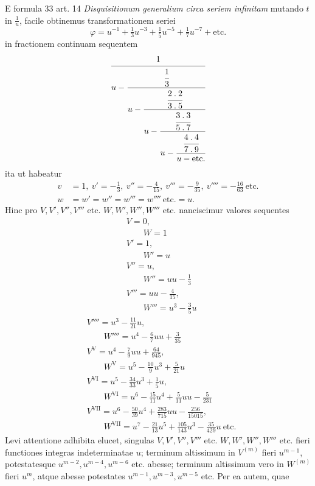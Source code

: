 E formula 33 art. 14 \textit{Disquisitionum generalium circa seriem infinitam} mutando $t$ in $\frac1u$, facile obtinemus transformationem seriei
\[
\varphi=u^{-1}+\tfrac13u^{-3}+\tfrac15u^{-5}+\tfrac17u^{-7}+\text{etc.}
\]
in fractionem continuam sequentem
\[
\cfrac{1}{u-\cfrac{\cfrac13}{u-\cfrac{\cfrac{2\mathbin{.}2}{3\mathbin{.}5}}{u-\cfrac{\cfrac{3\mathbin{.}3}{5\mathbin{.}7}}{u-\cfrac{\cfrac{4\mathbin{.}4}{7\mathbin{.}9}}{u-\text{etc.}}}}}}
\]
ita ut habeatur
\[
\begin{aligned}
v&=1,\ v'=-\tfrac13,\ v''=-\tfrac4{15},\ v'''=-\tfrac9{35},\ v''''=-\tfrac{16}{63}\ \text{etc.}\\
w&=w'=w''=w'''=w''''\ \text{etc.}=u.
\end{aligned}
\]
Hinc pro $V,V',V'',V'''$ etc. $W,W',W'',W'''$ etc. nanciscimur valores sequentes
\[
\begin{aligned}&V=0,\\[5pt]&\qquad W=1\\[5pt]&V'=1,\\[5pt]&\qquad W'=u\\[5pt]&V''=u,\\[5pt]&\qquad W''=uu-\tfrac13\\[5pt]&V'''=uu-\tfrac4{15},\\[5pt]&\qquad W'''=u^3-\tfrac35u\end{aligned}\]
\[\begin{aligned}&V''''=u^3-\tfrac{11}{21}u,\\[5pt]&\qquad W''''=u^4-\tfrac67uu+\tfrac3{35}\\[5pt]&V^{\mathrm{V}}=u^4-\tfrac79uu+\tfrac{64}{945},\\[5pt]&\qquad W^{\mathrm{V}}=u^5-\tfrac{10}{9}u^3+\tfrac5{21}u\\[5pt]&V^{\mathrm{VI}}=u^5-\tfrac{34}{33}u^3+\tfrac15u,\\[5pt]&\qquad W^{\mathrm{VI}}=u^6-\tfrac{15}{11}u^4+\tfrac5{11}uu-\tfrac5{231}\\[5pt]&V^{\mathrm{VII}}=u^6-\tfrac{50}{39}u^4+\tfrac{283}{715}uu-\tfrac{256}{15015},\\[5pt]&\qquad W^{\mathrm{VII}}=u^7-\tfrac{21}{13}u^5+\tfrac{105}{143}u^3-\tfrac{35}{429}u\ \text{etc.}\end{aligned}
\]
Levi attentione adhibita elucet, singulas $V,V',V'',V'''$ etc. $W,W',W'',W'''$ etc.
fieri functiones integras indeterminatae $u$; terminum altissimum in $V^{(m)}$ fieri
$u^{m-1}$, potestatesque $u^{m-2},u^{m-4},u^{m-6}$ etc. abesse; terminum altissimum vero in
$W^{(m)}$ fieri $u^m$, atque abesse potestates $u^{m-1},u^{m-3},u^{m-5}$ etc. Per ea autem, quae
